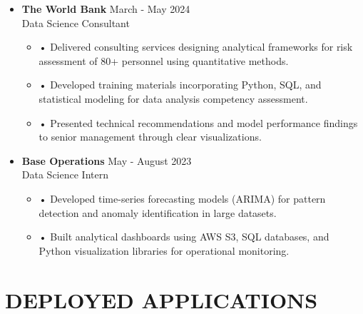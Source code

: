 \documentclass[a4paper,9pt]{extarticle}
\begin{document}
\noindent
\begin{itemize}[leftmargin=0.4cm, label={}]
    \item \textbf{The World Bank} \hfill March - May 2024 \\
    Data Science Consultant
    \vspace{-0.1cm}
    \begin{itemize}[leftmargin=0.3cm, label={}]
    \item \small{•} \normalsize{Delivered consulting services designing analytical frameworks for risk assessment of 80+ personnel using quantitative methods.}
    \item \small{•} \normalsize{Developed training materials incorporating Python, SQL, and statistical modeling for data analysis competency assessment.}
    \item \small{•} \normalsize{Presented technical recommendations and model performance findings to senior management through clear visualizations.}
    \end{itemize}
\end{itemize}

\noindent
\begin{itemize}[leftmargin=0.4cm, label={}]
    \item \textbf{Base Operations} \hfill May - August 2023 \\
    Data Science Intern
    \vspace{-0.1cm}
    \begin{itemize}[leftmargin=0.3cm, label={}]
    \item \small{•} \normalsize{Developed time-series forecasting models (ARIMA) for pattern detection and anomaly identification in large datasets.}
    \item \small{•} \normalsize{Built analytical dashboards using AWS S3, SQL databases, and Python visualization libraries for operational monitoring.}
    \end{itemize}
\end{itemize}

\section*{DEPLOYED APPLICATIONS}
\end{document}
